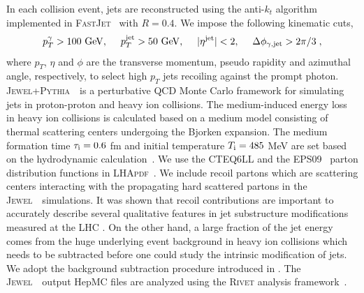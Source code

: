 \documentclass[notoc]{JHEP3}
\newcommand{\text}[1]{{\rm #1}}
\newcommand{\jw}{\textsc{Jewel}~}
\newcommand{\jwpy}{\textsc{Jewel+Pythia}~}
\begin{document}
In each collision event, jets are reconstructed using the anti-$k_{t}$ algorithm~\cite{Cacciari:2008gp} implemented in \textsc{FastJet}~\cite{Cacciari:2011ma} with $R = 0.4$. We impose the following kinematic cuts,
\begin{equation}
    p^{\gamma}_T > 100~{\rm GeV}, ~~~~ p^{\rm jet}_T > 50~{\rm GeV}, ~~~~ |\eta^{\rm jet}|<2, ~~~~\Delta \phi_{\gamma, {\rm jet}} > 2\pi/3\;,
\end{equation}
where $p_T$, $\eta$ and $\phi$ are the transverse momentum, pseudo rapidity and azimuthal angle, respectively, to select high $p_T$ jets recoiling against the prompt photon. \jwpy ~is a perturbative QCD Monte Carlo framework for simulating jets in proton-proton and heavy ion collisions. The medium-induced energy loss in heavy ion collisions is calculated based on a medium model consisting of thermal scattering centers undergoing the Bjorken expansion. The medium formation time $\tau_\text{i}=0.6 $ fm and initial temperature $T_\text{i}=485$ MeV are set based on the hydrodynamic calculation~\cite{Shen:2012vn,Shen:2014vra}. We use the \textsc{CTEQ6LL} \cite{Pumplin:2002vw} and the \textsc{EPS09}~\cite{Eskola:2009uj} parton distribution functions in \textsc{LHApdf}~\cite{Whalley:2005nh}. We include recoil partons which are scattering centers interacting with the propagating hard scattered partons in the \jw~simulations. It was shown that recoil contributions are important to accurately describe several qualitative features in jet substructure modifications measured at the LHC \cite{KunnawalkamElayavalli:2017hxo,Milhano:2017nzm}. On the other hand, a large fraction of the jet energy comes from the huge underlying event background in heavy ion collisions which needs to be subtracted before one could study the intrinsic modification of jets. We adopt the background subtraction procedure introduced in \cite{KunnawalkamElayavalli:2017hxo}. The \jw ~output HepMC files are analyzed using the \textsc{Rivet} analysis framework~\cite{}.
\end{document}

